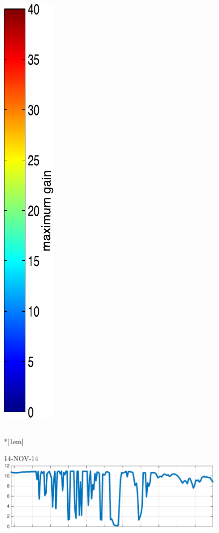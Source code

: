 \begin{figure}
\begin{minipage}[c]{\mylength}
\includegraphics[valign=t,trim=2pt -8pt 0 5pt,width=\colorbarwidth,totalheight=\eventheight]{events/colorbar-40.pdf}
\end{minipage} \\*[1em]
\begin{minipage}[c]{\mylength}
\centering \scriptsize 14-NOV-14 \\
\includegraphics[valign=t,trim=0 0 5pt 0,angle=90,origin=tr,width=\sunintwidth,totalheight=\eventheight]{events/20141114-intensity.pdf}

\end{minipage}
\end{figure}
